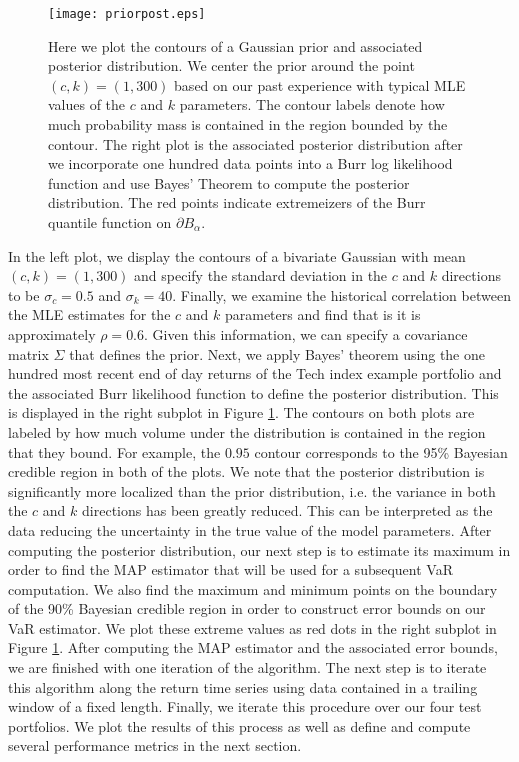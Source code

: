 \documentclass{amsart}
\begin{document}
\begin{figure}[h!]
    \centering
    \texttt{[image: priorpost.eps]}
    \caption{Here we plot the contours of a Gaussian prior and associated posterior distribution. We 
    center the prior around the point $(c,k)=(1,300)$ based on our past experience with typical MLE 
    values of the $c$ and $k$ parameters.  The contour labels denote how much probability mass is contained 
    in the region bounded by the contour. The right plot is the associated posterior distribution
    after we incorporate one hundred data points into a Burr log likelihood function 
    and use Bayes' Theorem to 
    compute the posterior distribution. The red points indicate extremeizers of the Burr quantile 
    function on $\partial B_\alpha$.}
    \label{pripost}
\end{figure}

In the left plot, we display the contours of a bivariate Gaussian with mean $(c,k)=(1,300)$ and 
specify the standard deviation
in the $c$ and $k$ directions to be $\sigma_c=0.5$ and $\sigma_k = 40$.  Finally, 
we examine the historical correlation between the MLE estimates for the $c$ and $k$ parameters and 
find that is it is approximately $\rho=0.6$.  Given this information, we can specify a covariance matrix 
$\Sigma$ that defines the prior.
Next, we apply Bayes' theorem using the one hundred most recent end of day returns of the Tech index  
example portfolio and the associated Burr likelihood function to define the posterior distribution. 
This is displayed in the right subplot in Figure \ref{pripost}. The contours on both plots are 
labeled by how much volume under the distribution is contained in the region that they bound.  For 
example, the $0.95$ contour corresponds to the 95\% Bayesian credible region in both of the plots.
We note that the posterior distribution is significantly more localized than the prior distribution, i.e. 
the variance in both the $c$ and $k$ directions has been greatly reduced.  This can be
interpreted as the data reducing the uncertainty in the true value of the model parameters.  After 
computing the posterior distribution,  our next step is to estimate its maximum in order to find 
the MAP estimator that will be used for a subsequent VaR computation.  We also find the 
maximum and minimum points on the boundary of the 
90\% Bayesian credible region in order to construct error bounds on 
our VaR estimator.  We plot these extreme values as red dots in the right subplot
in Figure \ref{pripost}.   After computing the MAP estimator and the associated error bounds, we are 
finished with one iteration of the algorithm.  The next step is to iterate this algorithm 
along the return time series using data contained in a trailing window of a fixed length. 
Finally, we iterate this procedure over our four test portfolios.  We plot the 
results of this process as well as define and compute several performance metrics in the next 
section. 
\end{document}
